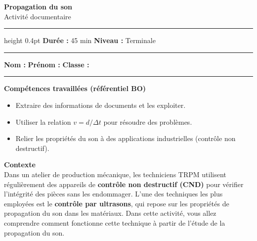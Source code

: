 \documentclass[12pt,a4paper]{article}
\begin{document}

\begin{tcolorbox}[
  colback=white, colframe=bluedark, boxrule=1.5pt, arc=4pt,
  before skip=0pt, after skip=8pt,
  left=10pt, right=10pt, top=8pt, bottom=8pt,
]
  \begin{center}
    {\color{bluedark}\Large\bfseries Propagation du son}\\[4pt]
    {\large Activité documentaire}\\[6pt]
    \hrule height 0.4pt \vspace{6pt}
    \textbf{Durée :} 45 min \hfill \textbf{Niveau :} Terminale 
  \end{center}
\end{tcolorbox}

\vspace{2pt}
\noindent\rule{\linewidth}{0.5pt}
\vspace{4pt}

\noindent\textbf{Nom :} \dotfill \hspace{1cm} \textbf{Prénom :} \dotfill \hspace{1cm} \textbf{Classe :} \dotfill

\vspace{2pt}
\noindent\rule{\linewidth}{0.5pt}
\vspace{6pt}

\begin{tcolorbox}[styleinfo]
  \textbf{\color{bluedark}Compétences travaillées (référentiel BO)}
  \begin{itemize}[noitemsep, leftmargin=1.2em]
    \item Extraire des informations de documents et les exploiter.
    \item Utiliser la relation $v = d / \Delta t$ pour résoudre des problèmes.
    \item Relier les propriétés du son à des applications industrielles (contrôle non destructif).
  \end{itemize}
\end{tcolorbox}

\begin{tcolorbox}[styleinfo]
  \textbf{\color{bluedark}Contexte}\\[4pt]
  Dans un atelier de production mécanique, les techniciens TRPM utilisent régulièrement
  des appareils de \textbf{contrôle non destructif (CND)} pour vérifier l'intégrité des pièces
  sans les endommager. L'une des techniques les plus employées est le \textbf{contrôle par
  ultrasons}, qui repose sur les propriétés de propagation du son dans les matériaux.
  Dans cette activité, vous allez comprendre comment fonctionne cette technique à partir
  de l'étude de la propagation du son.
\end{tcolorbox}
\end{document}
